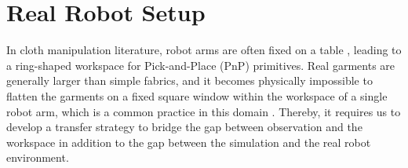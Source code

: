 \documentclass[journal]{IEEEtran}
\newcommand{\addinfo}[1]{\textcolor{myPurple}{#1}}
\begin{document}
\section{Real Robot Setup} \label{sec:real-world-setup}

\addinfo{In cloth manipulation literature, robot arms are often fixed on a table  \cite{lin2022learning,lee2024learning,canberk2023cloth}, leading to a ring-shaped workspace for Pick-and-Place (PnP) primitives. Real garments are generally larger than simple fabrics, and it becomes physically impossible to flatten the garments on a fixed square window within the workspace of a single robot arm, which is \addinfo{a common practice in this domain \cite{kadi2025draper, hoque2022visuospatial, lee2021learning}}. Thereby, it requires us to develop a transfer strategy to bridge the gap between observation and the workspace in addition to the gap between the simulation and the real robot environment.}
\end{document}
